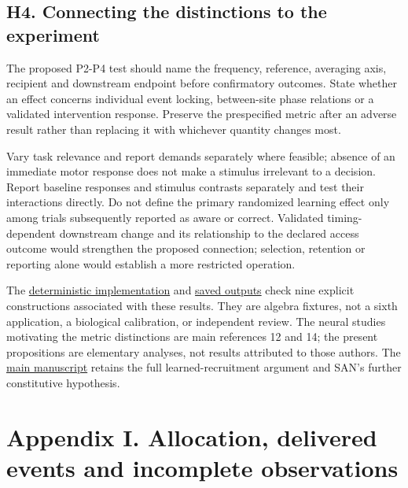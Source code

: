 \documentclass[
  american,
  11pt,
  letterpaper,
]{article}
\begin{document}
\subsection{H4. Connecting the distinctions to the experiment}\label{h4.-connecting-the-distinctions-to-the-experiment}

The proposed P2-P4 test should name the frequency, reference, averaging axis, recipient and downstream endpoint before confirmatory outcomes. State whether an effect concerns individual event locking, between-site phase relations or a validated intervention response. Preserve the prespecified metric after an adverse result rather than replacing it with whichever quantity changes most.

Vary task relevance and report demands separately where feasible; absence of an immediate motor response does not make a stimulus irrelevant to a decision. Report baseline responses and stimulus contrasts separately and test their interactions directly. Do not define the primary randomized learning effect only among trials subsequently reported as aware or correct. Validated timing-dependent downstream change and its relationship to the declared access outcome would strengthen the proposed connection; selection, retention or reporting alone would establish a more restricted operation.

The \href{https://github.com/v5ma/v5ma.github.io/blob/master/papers/companions/learning-to-feel-v1.0/analysis/access-metric-check.mjs}{deterministic implementation} and \href{https://github.com/v5ma/v5ma.github.io/blob/master/papers/companions/learning-to-feel-v1.0/analysis/access-metric-results.json}{saved outputs} check nine explicit constructions associated with these results. They are algebra fixtures, not a sixth application, a biological calibration, or independent review. The neural studies motivating the metric distinctions are main references 12 and 14; the present propositions are elementary analyses, not results attributed to those authors. The \href{https://raw.githubusercontent.com/v5ma/v5ma.github.io/master/papers/companions/learning-to-feel-v1.0/Learning-to-Feel-v1.0.pdf}{main manuscript} retains the full learned-recruitment argument and SAN's further constitutive hypothesis.

\clearpage
\hypertarget{appendix-i}{}

\section{Appendix I. Allocation, delivered events and incomplete observations}\label{appendix-i.-allocation-delivered-events-and-incomplete-observations}
\end{document}
